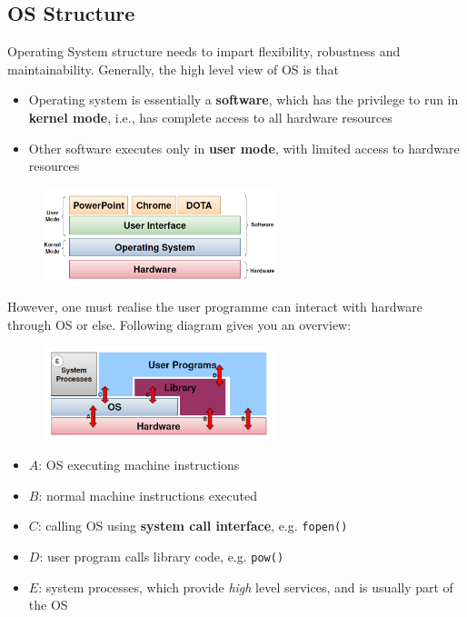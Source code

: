 \documentclass[12pt]{article}
\theoremstyle{definition}
\begin{document}
\subsection{OS Structure}
Operating System structure needs to impart flexibility, robustness and maintainability. Generally, the high level view of OS is that
\begin{itemize}
  \item Operating system is essentially a \textbf{software}, which has the privilege to run in \textbf{kernel mode}, i.e., has complete access to all hardware resources
  \item Other software executes only in \textbf{user mode}, with limited access to hardware resources
\end{itemize}
\begin{figure}[h]
\centering
\includegraphics[width = 0.6\textwidth]{1_4.png}
\end{figure}
However, one must realise the user programme can interact with hardware through OS or else. Following diagram gives you an overview:
\begin{figure}[h]
\centering
\includegraphics[width = 0.6\textwidth]{1_5.png}
\end{figure}
\begin{itemize}
  \item $A$: OS executing machine instructions
  \item $B$: normal machine instructions executed
  \item $C$: calling OS using \textbf{system call interface}, e.g. \texttt{fopen()}
  \item $D$: user program calls library code, e.g. \texttt{pow()}
  \item $E$: system processes, which provide \textit{high} level services, and is usually part of the OS
\end{itemize}
\end{document}
